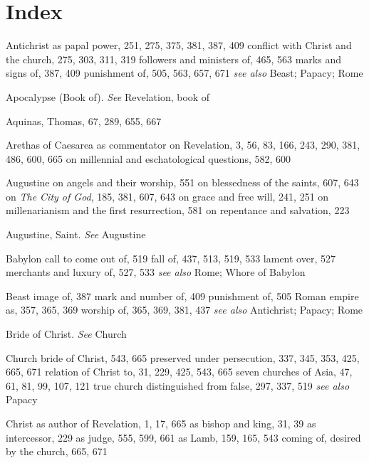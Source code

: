 \chapter*{Index}

\begin{theindex}

\item Antichrist
\subitem as papal power, 251, 275, 375, 381, 387, 409
\subitem conflict with Christ and the church, 275, 303, 311, 319
\subitem followers and ministers of, 465, 563
\subitem marks and signs of, 387, 409
\subitem punishment of, 505, 563, 657, 671
\subitem \emph{see also} Beast; Papacy; Rome
\item Apocalypse (Book of). \emph{See} Revelation, book of
\item Aquinas, Thomas, 67, 289, 655, 667
\item Arethas of Caesarea
\subitem as commentator on Revelation, 3, 56, 83, 166, 243, 290, 381, 486, 600, 665
\subitem on millennial and eschatological questions, 582, 600
\item Augustine
\subitem on angels and their worship, 551
\subitem on blessedness of the saints, 607, 643
\subitem on \textit{The City of God}, 185, 381, 607, 643
\subitem on grace and free will, 241, 251
\subitem on millenarianism and the first resurrection, 581
\subitem on repentance and salvation, 223
\item Augustine, Saint. \emph{See} Augustine

\indexspace

\item Babylon
\subitem call to come out of, 519
\subitem fall of, 437, 513, 519, 533
\subitem lament over, 527
\subitem merchants and luxury of, 527, 533
\subitem \emph{see also} Rome; Whore of Babylon
\item Beast
\subitem image of, 387
\subitem mark and number of, 409
\subitem punishment of, 505
\subitem Roman empire as, 357, 365, 369
\subitem worship of, 365, 369, 381, 437
\subitem \emph{see also} Antichrist; Papacy; Rome
\item Bride of Christ. \emph{See} Church

\indexspace

\item Church
\subitem bride of Christ, 543, 665
\subitem preserved under persecution, 337, 345, 353, 425, 665, 671
\subitem relation of Christ to, 31, 229, 425, 543, 665
\subitem seven churches of Asia, 47, 61, 81, 99, 107, 121
\subitem true church distinguished from false, 297, 337, 519
\subitem \emph{see also} Papacy
\item Christ
\subitem as author of Revelation, 1, 17, 665
\subitem as bishop and king, 31, 39
\subitem as intercessor, 229
\subitem as judge, 555, 599, 661
\subitem as Lamb, 159, 165, 543
\subitem coming of, desired by the church, 665, 671


\end{theindex}
